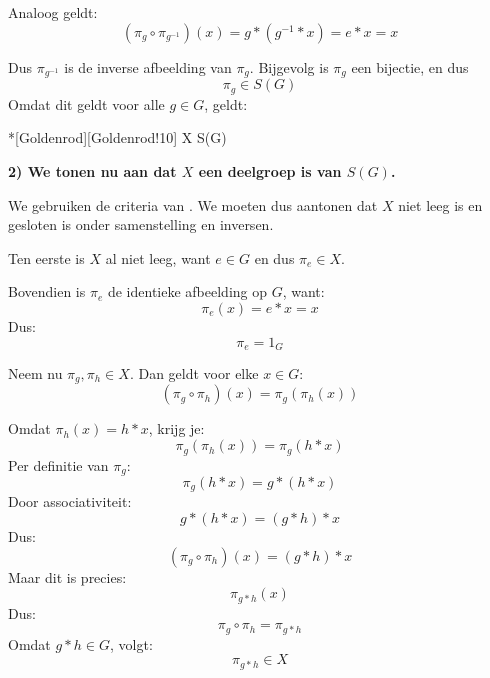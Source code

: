 \begin{nicetheorem}
    Analoog geldt:
    \begin{equation*}
        (\pi_g \circ \pi_{g^{-1}})(x) = g * (g^{-1} * x) = e * x = x
    \end{equation*}

    Dus $\pi_{g^{-1}}$ is de inverse afbeelding van $\pi_g$. Bijgevolg is $\pi_g$ een bijectie, en dus
    \begin{equation*}
        \pi_g \in S(G)
    \end{equation*}
    Omdat dit geldt voor alle $g \in G$, geldt:
    \begin{equationbox}*[Goldenrod][Goldenrod!10]
        X \subseteq S(G)
    \end{equationbox}

    \textbf{2) We tonen nu aan dat $X$ een deelgroep is van $S(G)$.}

    We gebruiken de criteria van . We moeten dus aantonen dat $X$ niet leeg is en gesloten is onder samenstelling en inversen.

    Ten eerste is $X$ al niet leeg, want $e \in G$ en dus $\pi_e \in X$.

    Bovendien is $\pi_e$ de identieke afbeelding op $G$, want:
    \begin{equation*}
        \pi_e(x) = e * x = x
    \end{equation*}
    Dus:
    \begin{equation*}
        \pi_e = 1_G
    \end{equation*}

    Neem nu $\pi_g, \pi_h \in X$. Dan geldt voor elke $x \in G$:
    \begin{equation*}
        (\pi_g \circ \pi_h)(x) = \pi_g(\pi_h(x))
    \end{equation*}

    Omdat $\pi_h(x) = h * x$, krijg je:
    \begin{equation*}
        \pi_g(\pi_h(x)) = \pi_g(h*x)
    \end{equation*}
    Per definitie van $\pi_g$:
    \begin{equation*}
        \pi_g(h*x) = g*(h*x)
    \end{equation*}
    Door associativiteit:
    \begin{equation*}
        g*(h*x) = (g*h)*x
    \end{equation*}
    Dus:
    \begin{equation*}
        (\pi_g \circ \pi_h)(x) = (g*h)*x
    \end{equation*}
    Maar dit is precies:
    \begin{equation*}
        \pi_{g*h}(x)
    \end{equation*}
    Dus:
    \begin{equation*}
        \pi_g \circ \pi_h = \pi_{g*h}
    \end{equation*}
    Omdat $g*h \in G$, volgt:
    \begin{equation*}
        \pi_{g*h} \in X
    \end{equation*}


\end{nicetheorem}
